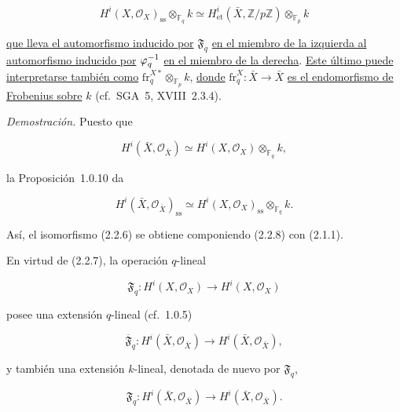 \begin{equation}\tag{2.2.6}
H^i(X,\mathcal O_X)_{\mathrm{ss}}\otimes_{\mathbb F_q}k
\simeq
H^i_{\mathrm{et}}(\bar X,\mathbb Z/p\mathbb Z)
\otimes_{\mathbb F_p}k
\end{equation}

\underline{que lleva el automorfismo inducido por} $\mathfrak F_q$ \underline{en el miembro de la
izquierda al automorfismo inducido por} $\sisi{\varphi_q^{-1}\otimes_{\mathbb F_q}k}{\varphi_q^{-1}}$ \underline{en el miembro de la
derecha}. \underline{Este último puede interpretarse también como}
$\mathrm{fr}_q^{X*}\otimes_{\mathbb F_p}k$, \underline{donde}
$\mathrm{fr}_q^X:\bar X\longrightarrow\bar X$ \underline{es el endomorfismo de
Frobenius sobre} $k$ (cf.~SGA~5, XVIII~2.3.4).

\medskip
\noindent\emph{Demostración.}
Puesto que

\begin{equation}\tag{2.2.7}
H^i(\bar X,\mathcal O_{\bar X})\simeq
H^i(X,\mathcal O_X)\otimes_{\mathbb F_q}k,
\end{equation}

la Proposición~1.0.10 da

\begin{equation}\tag{2.2.8}
H^i(\bar X,\mathcal O_{\bar X})_{\mathrm{ss}}\simeq
H^i(X,\mathcal O_X)_{\mathrm{ss}}\otimes_{\mathbb F_q}k.
\end{equation}

Así, el isomorfismo (2.2.6) se obtiene componiendo (2.2.8) con (2.1.1).

En virtud de (2.2.7), la operación $q$-lineal

\begin{equation}\tag{2.2.9}
\mathfrak F_q:H^i(X,\mathcal O_X)\longrightarrow H^i(X,\mathcal O_X)
\end{equation}

posee una extensión $q$-lineal (cf.~1.0.5)

\begin{equation}\tag{2.2.10}
\overline{\mathfrak F}_q:H^i(\bar X,\mathcal O_{\bar X})
\longrightarrow H^i(\bar X,\mathcal O_{\bar X}),
\end{equation}

y también una extensión $k$-lineal, denotada de nuevo por
$\mathfrak F_q$,

\begin{equation}\tag{2.2.11}
\mathfrak F_q:H^i(\bar X,\mathcal O_{\bar X})
\longrightarrow H^i(\bar X,\mathcal O_{\bar X}).
\end{equation}

